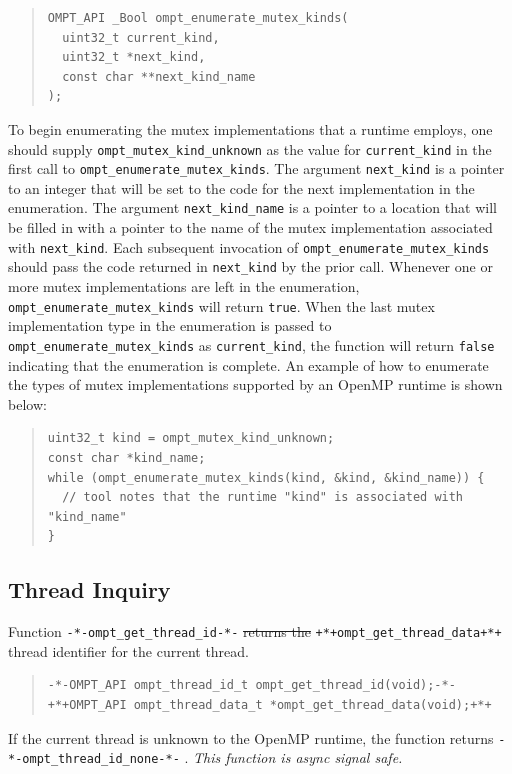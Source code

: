 \documentclass{article}
\providecommand{\DIFadd}[1]{{\protect\color{blue}\uwave{#1}}} %
\providecommand{\DIFdel}[1]{{\protect\color{red}\sout{#1}}}                      %
\providecommand{\DIFaddbegin}{} %
\providecommand{\DIFaddend}{} %
\providecommand{\DIFdelbegin}{} %
\providecommand{\DIFdelend}{} %
\begin{document}
\begin{quote}
\begin{lstlisting}
OMPT_API _Bool ompt_enumerate_mutex_kinds(
  uint32_t current_kind, 
  uint32_t *next_kind, 
  const char **next_kind_name
);
\end{lstlisting}
\end{quote}

\noindent
\sloppy
To begin enumerating the mutex implementations that a runtime  employs, one should supply 
 \lstinline|ompt_mutex_kind_unknown| as the value for \lstinline|current_kind| in the first call to \lstinline|ompt_enumerate_mutex_kinds|.
The argument \lstinline|next_kind| is a pointer to an integer that will be set to the code for the next implementation in the enumeration.
The argument \lstinline|next_kind_name| is a pointer to a location that will be filled in with a pointer to the name of the mutex implementation associated with \lstinline|next_kind|. 
Each subsequent invocation of \lstinline|ompt_enumerate_mutex_kinds| should pass the code returned in \lstinline|next_kind| by the prior call.
Whenever one or more mutex implementations are left in the enumeration, \lstinline|ompt_enumerate_mutex_kinds| will return \lstinline|true|.
When the last mutex implementation type in the enumeration is passed to \lstinline|ompt_enumerate_mutex_kinds| as \lstinline|current_kind|, 
the function will return \lstinline|false| indicating that the enumeration is complete.
An example of how to enumerate the types of mutex implementations supported by an OpenMP runtime is shown below:

\begin{quote}
\begin{lstlisting}
uint32_t kind = ompt_mutex_kind_unknown;
const char *kind_name;
while (ompt_enumerate_mutex_kinds(kind, &kind, &kind_name)) {
  // tool notes that the runtime "kind" is associated with "kind_name" 
}
\end{lstlisting}
\end{quote}


\subsection{Thread Inquiry}
\label{sec:thread-inquiry}

Function \DIFdelbegin \lstinline|-*-ompt_get_thread_id-*-| %
\DIFdel{returns the }\DIFdelend \DIFaddbegin\lstinline|+*+ompt_get_thread_data+*+| \DIFadd{returns the address of the }\DIFaddend thread 
identifier for the current thread.
\begin{quote}
\begin{lstlisting}
-*-OMPT_API ompt_thread_id_t ompt_get_thread_id(void);-*-
+*+OMPT_API ompt_thread_data_t *ompt_get_thread_data(void);+*+\end{lstlisting} \end{quote}
If the current thread is unknown to the OpenMP runtime, the function returns \DIFdelbegin \lstinline|-*-ompt_thread_id_none-*-|%
\DIFdelend \DIFaddbegin \DIFadd{NULL}\DIFaddend .
{\em This function is async signal safe.}
\end{document}

